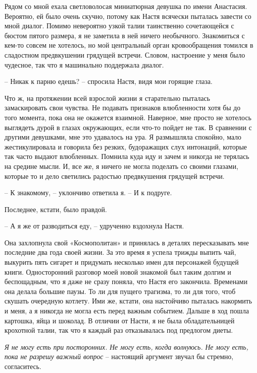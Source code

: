 \documentclass[
]{book}
\begin{document}
Рядом со мной ехала светловолосая миниатюрная девушка по имени Анастасия. Вероятно, ей было очень скучно, потому как Настя всячески пыталась завести со мной диалог. Помимо невероятно узкой талии таинственно сочетающейся с бюстом пятого размера, я не заметила в ней ничего необычного. Знакомиться с кем-то совсем не хотелось, но мой центральный орган кровообращения томился в сладостном предвкушении грядущей встречи. Словом, настроение у меня было чудесное, так что я машинально поддержала диалог.

-- Никак к парню едешь? -- спросила Настя, видя мои горящие глаза.

Что ж, на протяжении всей взрослой жизни я старательно пыталась замаскировать свои чувства. Не подавать признаков влюбленности хотя бы до того момента, пока она не окажется взаимной. Наверное, мне просто не хотелось выглядеть дурой в глазах окружающих, если что-то пойдет не так. В сравнении с другими девушками, мне это удавалось на ура. Я размышляла спокойно, мало жестикулировала и говорила без резких, будоражащих слух интонаций, которые так часто выдают влюбленных. Помнила куда иду и зачем и никогда не терялась на средине мысли. И, все же, я ничего не могла поделать со своими глазами, которые то и дело светились радостью предвкушения грядущей встречи.

-- К знакомому, -- уклончиво ответила я. -- И к подруге.

Последнее, кстати, было правдой.

-- А я же от разводиться еду, -- удрученно вздохнула Настя.

Она захлопнула свой «Космополитан» и принялась в деталях пересказывать мне последние два года своей жизни. За это время я успела трижды выпить чай, выкурить пять сигарет и придумать несколько имен для персонажей будущей книги. Односторонний разговор моей новой знакомой был таким долгим и беспощадным, что я даже не сразу поняла, что Настя его закончила. Временами она делала большие паузы. То ли для пущего трагизма, то ли для того, чтоб скушать очередную котлету. Ими же, кстати, она настойчиво пыталась накормить и меня, а я никогда не могла есть перед важным событием. Дальше в ход пошла картошка, яйца и шоколад. В отличии от Насти, я не была обладательницей крохотной талии, так что я каждый раз отказывалась под предлогом диеты.

\emph{Я не могу есть при посторонних. Не могу есть, когда волнуюсь. Не могу есть, пока не разрешу важный вопрос} -- настоящий аргумент звучал бы стремно, согласитесь.
\end{document}
